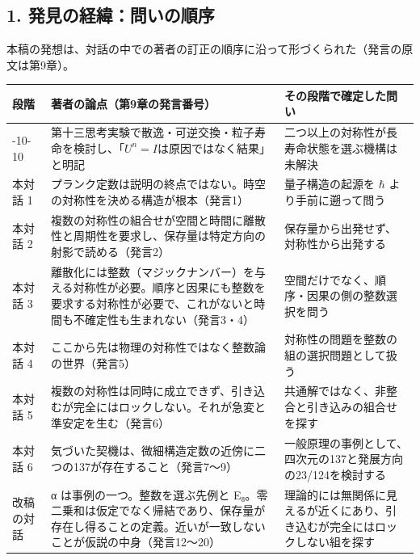 \documentclass[
  a4paper,
]{ltjsarticle}
\newcounter{none} %
\begin{document}
\subsection{1.
発見の経緯：問いの順序}\label{ux767aux898bux306eux7d4cux7defux554fux3044ux306eux9806ux5e8f}

本稿の発想は、対話の中での著者の訂正の順序に沿って形づくられた（発言の原文は第9章）。

{\def\LTcaptype{none} %
\begin{longtable}[]{@{}
  >{\raggedright\arraybackslash}p{}
  >{\raggedright\arraybackslash}p{}
  >{\raggedright\arraybackslash}p{}@{}}
\toprule\noalign{}
\begin{minipage}[b]{\linewidth}\raggedright
段階
\end{minipage} & \begin{minipage}[b]{\linewidth}\raggedright
著者の論点（第9章の発言番号）
\end{minipage} & \begin{minipage}[b]{\linewidth}\raggedright
その段階で確定した問い
\end{minipage} \\
\midrule\noalign{}
\endhead
\bottomrule\noalign{}
\endlastfoot
2026-10-10 &
第十三思考実験で散逸・可逆交換・粒子寿命を検討し、「\(U^n=I\)は原因ではなく結果」と明記
& 二つ以上の対称性が長寿命状態を選ぶ機構は未解決 \\
本対話 1 &
プランク定数は説明の終点ではない。時空の対称性を決める構造が根本（発言1）
& 量子構造の起源を \(\hbar\) より手前に遡って問う \\
本対話 2 &
複数の対称性の組合せが空間と時間に離散性と周期性を要求し、保存量は特定方向の射影で読める（発言2）
& 保存量から出発せず、対称性から出発する \\
本対話 3 &
離散化には整数（マジックナンバー）を与える対称性が必要。順序と因果にも整数を要求する対称性が必要で、これがないと時間も不確定性も生まれない（発言3・4）
& 空間だけでなく、順序・因果の側の整数選択を問う \\
本対話 4 & ここから先は物理の対称性ではなく整数論の世界（発言5） &
対称性の問題を整数の組の選択問題として扱う \\
本対話 5 &
複数の対称性は同時に成立できず、引き込むが完全にはロックしない。それが急変と準安定を生む（発言6）
& 共通解ではなく、非整合と引き込みの組合せを探す \\
本対話 6 &
気づいた契機は、微細構造定数の近傍に二つの137が存在すること（発言7〜9）
& 一般原理の事例として、四次元の137と発展方向の23/124を検討する \\
改稿の対話 & α は事例の一つ。整数を選ぶ先例と
E₈。零二乗和は仮定でなく帰結であり、保存量が存在し得ることの定義。近いが一致しないことが仮説の中身（発言12〜20）
&
理論的には無関係に見えるが近くにあり、引き込むが完全にはロックしない組を探す \\
\end{longtable}
}
\end{document}
